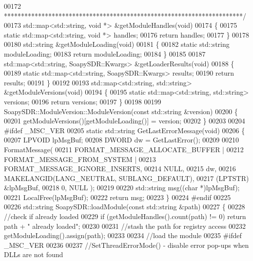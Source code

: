 \begin{DoxyCode}
{00172 \textcolor{comment}{ **********************************************************************/}
00173 std::map<std::string, void *> &getModuleHandles(\textcolor{keywordtype}{void})
00174 \{
00175     \textcolor{keyword}{static} std::map<std::string, void *> handles;
00176     \textcolor{keywordflow}{return} handles;
00177 \}
00178 
00180 std::string &getModuleLoading(\textcolor{keywordtype}{void})
00181 \{
00182     \textcolor{keyword}{static} std::string moduleLoading;
00183     \textcolor{keywordflow}{return} moduleLoading;
00184 \}
00185 
00187 std::map<std::string, SoapySDR::Kwargs> &getLoaderResults(\textcolor{keywordtype}{void})
00188 \{
00189     \textcolor{keyword}{static} std::map<std::string, SoapySDR::Kwargs> results;
00190     \textcolor{keywordflow}{return} results;
00191 \}
00192 
00193 std::map<std::string, std::string> &getModuleVersions(\textcolor{keywordtype}{void})
00194 \{
00195     \textcolor{keyword}{static} std::map<std::string, std::string> versions;
00196     \textcolor{keywordflow}{return} versions;
00197 \}
00198 
00199 SoapySDR::ModuleVersion::ModuleVersion(\textcolor{keyword}{const} std::string &version)
00200 \{
00201     getModuleVersions()[getModuleLoading()] = version;
00202 \}
00203 
00204 \textcolor{preprocessor}{#ifdef \_MSC\_VER}
00205 \textcolor{keyword}{static} std::string GetLastErrorMessage(\textcolor{keywordtype}{void})
00206 \{
00207     LPVOID lpMsgBuf;
00208     DWORD dw = GetLastError();
00209 
00210     FormatMessage(
00211         FORMAT\_MESSAGE\_ALLOCATE\_BUFFER |
00212         FORMAT\_MESSAGE\_FROM\_SYSTEM |
00213         FORMAT\_MESSAGE\_IGNORE\_INSERTS,
00214         NULL,
00215         dw,
00216         MAKELANGID(LANG\_NEUTRAL, SUBLANG\_DEFAULT),
00217         (LPTSTR) &lpMsgBuf,
00218         0, NULL );
00219 
00220     std::string msg((\textcolor{keywordtype}{char} *)lpMsgBuf);
00221     LocalFree(lpMsgBuf);
00222     \textcolor{keywordflow}{return} msg;
00223 \}
00224 \textcolor{preprocessor}{#endif}
00225 
00226 std::string SoapySDR::loadModule(\textcolor{keyword}{const} std::string &path)
00227 \{
00228     \textcolor{comment}{//check if already loaded}
00229     \textcolor{keywordflow}{if} (getModuleHandles().count(path) != 0) \textcolor{keywordflow}{return} path + \textcolor{stringliteral}{" already loaded"};
00230 
00231     \textcolor{comment}{//stash the path for registry access}
00232     getModuleLoading().assign(path);
00233 
00234     \textcolor{comment}{//load the module}
00235 \textcolor{preprocessor}{#ifdef \_MSC\_VER}
00236 
00237     \textcolor{comment}{//SetThreadErrorMode() - disable error pop-ups when DLLs are not found}
}
\end{DoxyCode}
